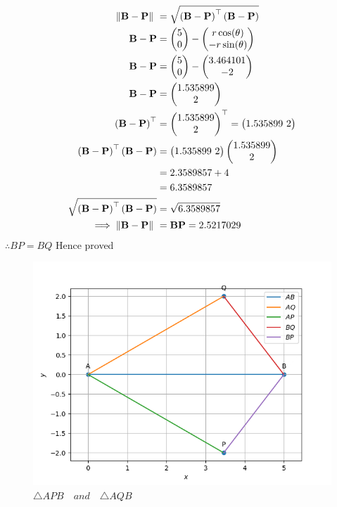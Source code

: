 \documentclass[11pt]{book}
\begin{document}
\begin{enumerate}
\begin{enumerate}
\begin{align}
\norm{\vec{B}-\vec{P}}\ &=  \sqrt{\brak{\vec{B}-\vec{P}}^{\top}\brak{\vec{B}-\vec{P}}} \\
\vec{B}-\vec{P} &= \myvec{5 \\ 0} - \myvec{r\cos(\theta) \\ -r\sin(\theta)} \\
\vec{B}-\vec{P} &= \myvec{5 \\ 0} - \myvec{3.464101 \\ -2} \\
\vec{B}-\vec{P} &= \myvec{1.535899 \\ 2} \\
\brak{\vec{B}-\vec{P}}^{\top} &= {\myvec{1.535899 \\ 2}}^{\top} = \myvec{1.535899 \ 2} \\
\brak{\vec{B}-\vec{P}}^{\top}\brak{\vec{B}-\vec{P}} &= \myvec{1.535899 \ 2} \myvec{1.535899 \\ 2}\\
&= 2.3589857 + 4 \\
&= 6.3589857 \\  
\sqrt{\brak{\vec{B}-\vec{P}}^{\top}\brak{\vec{B}-\vec{P}}} &= \sqrt{6.3589857}	\\
	\implies \norm{\vec{B}-\vec{P}}\ &= \vec{BP} = 2.5217029 
\end{align}
$\therefore  BP = BQ $ \hspace{12pt} Hence proved

\begin{figure}[H]
    \centering
    \includegraphics[width=\columnwidth]{fig_mat_comp.png}
    \caption{$\triangle APB \hspace{12pt} and \hspace{12pt} \triangle AQB$}
\end{figure}
\end{enumerate}
\end{enumerate}
%
\end{document}
